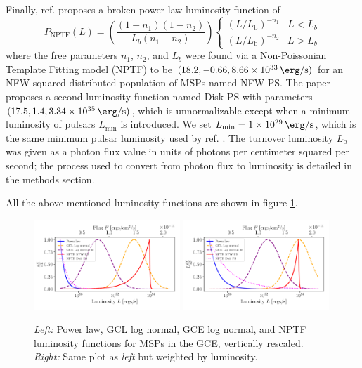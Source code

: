 \documentclass[a4paper,11pt]{article}
\newcommand{\parens}[1]{\left(#1\right)}
\newcommand{\fraci}[2]{#1 / #2}
\begin{document}
Finally, ref. \cite{Lee:2015fea} proposes a broken-power law luminosity function of
\begin{equation}
    P_\text{NPTF}(L) = \parens{\frac{\parens{1-n_1}\parens{1-n_2}}{L_b \parens{n_1 - n_2}}}\begin{cases}
        \parens{\fraci{L}{L_\text{b}}}^{-n_{1}} & L < L_{b} \\
        \parens{\fraci{L}{L_\text{b}}}^{-n_{2}} & L > L_b
    \end{cases}
    \label{eqn:nptf}
\end{equation}
where the free parameters  $n_1$, $n_2$, and $L_b$ were found via a Non-Poissonian Template Fitting model (NPTF) to be $(18.2, -0.66, \SI{8.66e+33}{\erg\per\second})$ for an NFW-squared-distributed population of MSPs named NFW PS. The paper proposes a second luminosity function named Disk PS with parameters $(17.5, 1.4, \SI{3.34e+35}{\erg\per\second})$, which is unnormalizable except when a minimum luminosity of pulsars $L_\text{min}$ is introduced. We set $L_\text{min}=\SI{1e29}{\erg\per\second}$, which is the same minimum pulsar luminosity used by ref. \cite{Zhong:2019ycb}. The turnover luminosity $L_\text{b}$ was given as a photon flux value in units of photons per centimeter squared per second; the process used to convert from photon flux to luminosity is detailed in the methods section.

All the above-mentioned luminosity functions are shown in figure \ref{fig:lum-funcs}.

\begin{figure}
    \centering
    \includegraphics[width=0.49\textwidth]{figs/lum-funcs.pdf}
    \includegraphics[width=0.49\textwidth]{figs/l-lum-funcs.pdf}
    \caption{\textit{Left:} Power law, GCL log normal, GCE log normal, and NPTF luminosity functions for MSPs in the GCE, vertically rescaled. \textit{Right:} Same plot as \textit{left} but weighted by luminosity.}
    \label{fig:lum-funcs}
\end{figure}
\end{document}
